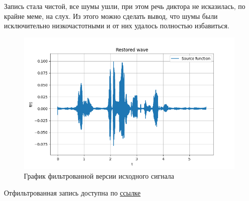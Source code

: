 Запись стала чистой, все шумы ушли, при этом речь диктора не исказилась, по крайне меме, на слух. Из этого можно сделать вывод, что шумы были исключительно низкочастотными и от них удалось полностью избавиться. 

\begin{figure}
    \centering
    \includegraphics[width=\textwidth]{../results/Restored audio file.png}
    \caption{График фильтрованной версии исходного сигнала}
    \label{fig:restored_audio}
\end{figure}

Отфильтрованная запись доступна по \href{https://drive.google.com/file/d/1xV_qfqg4C-Z8WqTi6AU7sM3sAt7slwk1/view?usp=share_link}{ссылке}